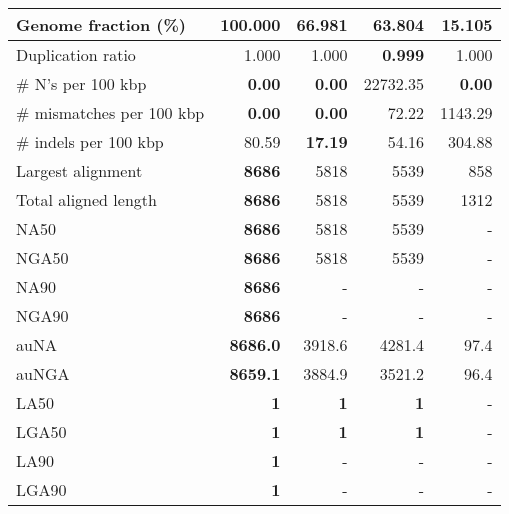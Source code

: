 \documentclass[12pt,a4paper]{article}
\begin{document}
\begin{table}[ht]
\begin{center}
\begin{tabular}{|l*{4}{|r}|}
Genome fraction (\%) & {\bf 100.000} & 66.981 & 63.804 & 15.105 \\ \hline
Duplication ratio & 1.000 & 1.000 & {\bf 0.999} & 1.000 \\ \hline
\# N's per 100 kbp & {\bf 0.00} & {\bf 0.00} & 22732.35 & {\bf 0.00} \\ \hline
\# mismatches per 100 kbp & {\bf 0.00} & {\bf 0.00} & 72.22 & 1143.29 \\ \hline
\# indels per 100 kbp & 80.59 & {\bf 17.19} & 54.16 & 304.88 \\ \hline
Largest alignment & {\bf 8686} & 5818 & 5539 & 858 \\ \hline
Total aligned length & {\bf 8686} & 5818 & 5539 & 1312 \\ \hline
NA50 & {\bf 8686} & 5818 & 5539 & - \\ \hline
NGA50 & {\bf 8686} & 5818 & 5539 & - \\ \hline
NA90 & {\bf 8686} & - & - & - \\ \hline
NGA90 & {\bf 8686} & - & - & - \\ \hline
auNA & {\bf 8686.0} & 3918.6 & 4281.4 & 97.4 \\ \hline
auNGA & {\bf 8659.1} & 3884.9 & 3521.2 & 96.4 \\ \hline
LA50 & {\bf 1} & {\bf 1} & {\bf 1} & - \\ \hline
LGA50 & {\bf 1} & {\bf 1} & {\bf 1} & - \\ \hline
LA90 & {\bf 1} & - & - & - \\ \hline
LGA90 & {\bf 1} & - & - & - \\ \hline
\end{tabular}
\end{center}
\end{table}
\end{document}
